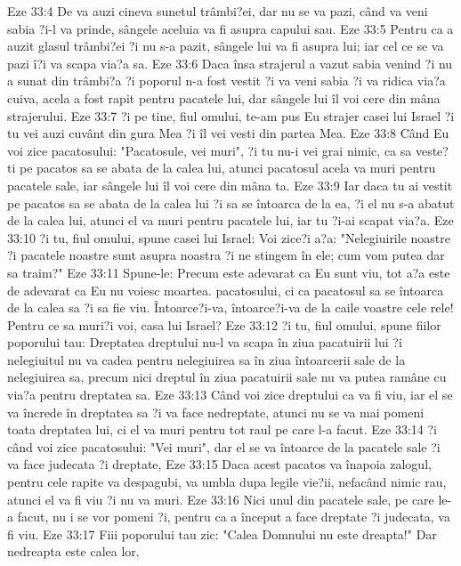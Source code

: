 Eze 33:4  De va auzi cineva sunetul trâmbi?ei, dar nu se va pazi, când va veni sabia ?i-l va prinde, sângele aceluia va fi asupra capului sau.
Eze 33:5  Pentru ca a auzit glasul trâmbi?ei ?i nu s-a pazit, sângele lui va fi asupra lui; iar cel ce se va pazi î?i va scapa via?a sa.
Eze 33:6  Daca însa strajerul a vazut sabia venind ?i nu a sunat din trâmbi?a ?i poporul n-a fost vestit ?i va veni sabia ?i va ridica via?a cuiva, acela a fost rapit pentru pacatele lui, dar sângele lui îl voi cere din mâna strajerului.
Eze 33:7  ?i pe tine, fiul omului, te-am pus Eu strajer casei lui Israel ?i tu vei auzi cuvânt din gura Mea ?i îl vei vesti din partea Mea.
Eze 33:8  Când Eu voi zice pacatosului: "Pacatosule, vei muri", ?i tu nu-i vei grai nimic, ca sa veste?ti pe pacatos sa se abata de la calea lui, atunci pacatosul acela va muri pentru pacatele sale, iar sângele lui îl voi cere din mâna ta.
Eze 33:9  Iar daca tu ai vestit pe pacatos sa se abata de la calea lui ?i sa se întoarca de la ea, ?i el nu s-a abatut de la calea lui, atunci el va muri pentru pacatele lui, iar tu ?i-ai scapat via?a.
Eze 33:10  ?i tu, fiul omului, spune casei lui Israel: Voi zice?i a?a: "Nelegiuirile noastre ?i pacatele noastre sunt asupra noastra ?i ne stingem în ele; cum vom putea dar sa traim?"
Eze 33:11  Spune-le: Precum este adevarat ca Eu sunt viu, tot a?a este de adevarat ca Eu nu voiesc moartea. pacatosului, ci ca pacatosul sa se întoarca de la calea sa ?i sa fie viu. Întoarce?i-va, întoarce?i-va de la caile voastre cele rele! Pentru ce sa muri?i voi, casa lui Israel?
Eze 33:12  ?i tu, fiul omului, spune fiilor poporului tau: Dreptatea dreptului nu-l va scapa în ziua pacatuirii lui ?i nelegiuitul nu va cadea pentru nelegiuirea sa în ziua întoarcerii sale de la nelegiuirea sa, precum nici dreptul în ziua pacatuirii sale nu va putea ramâne cu via?a pentru dreptatea sa.
Eze 33:13  Când voi zice dreptului ca va fi viu, iar el se va încrede în dreptatea sa ?i va face nedreptate, atunci nu se va mai pomeni toata dreptatea lui, ci el va muri pentru tot raul pe care l-a facut.
Eze 33:14  ?i când voi zice pacatosului: "Vei muri", dar el se va întoarce de la pacatele sale ?i va face judecata ?i dreptate,
Eze 33:15  Daca acest pacatos va înapoia zalogul, pentru cele rapite va despagubi, va umbla dupa legile vie?ii, nefacând nimic rau, atunci el va fi viu ?i nu va muri.
Eze 33:16  Nici unul din pacatele sale, pe care le-a facut, nu i se vor pomeni ?i, pentru ca a început a face dreptate ?i judecata, va fi viu.
Eze 33:17  Fiii poporului tau zic: "Calea Domnului nu este dreapta!" Dar nedreapta este calea lor.
